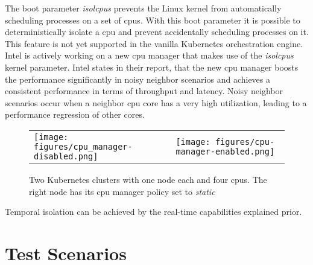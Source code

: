 \documentclass[titlepage]{report}
\begin{document}
The boot parameter \emph{isolcpus} prevents the Linux kernel from automatically scheduling processes on a set of \glspl{cpu}. With this boot parameter it is possible to deterministically isolate a \gls{cpu}
and prevent accidentally scheduling processes on it. This feature is not yet supported in the vanilla Kubernetes orchestration engine. Intel is actively working on a new \gls{cpu} manager that makes use of the
\emph{isolcpus} kernel parameter. Intel states in their report, that the new \gls{cpu} manager boosts the performance significantly in noisy neighbor scenarios and achieves a consistent performance
in terms of throughput and latency\cite{IntelCPUPinning}. Noisy neighbor scenarios occur when a neighbor \gls{cpu} core has a very high utilization, leading to a performance regression of other cores.
\begin{figure}[H]
  \centering
\begin{tabular}{ll}
\texttt{[image: figures/cpu\_manager-disabled.png]}
&
\texttt{[image: figures/cpu-manager-enabled.png]}
\end{tabular}
\caption{Two Kubernetes clusters with one node each and four \glspl{cpu}. The right node has its \gls{cpu} manager policy set to \emph{static}}\label{fig:cpu-manager}
\end{figure}
Temporal isolation can be achieved by the real-time capabilities explained prior.

\chapter{Test Scenarios}\label{chapter:test_scenarios}
\end{document}

